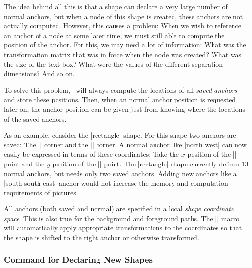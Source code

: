 The idea behind all this is that a shape can declare a very large
number of normal anchors, but when a node of this shape is created,
these anchors are not actually computed. However, this causes a
problem: When we wish to reference an anchor of a node at some later
time, we must still able to compute the position of the anchor. For 
this, we may need a lot of information: What was the transformation
matrix that was in force when the node was created? What was the size
of the text box? What were the values of the different separation
dimensions? And so on. 

To solve this problem, \pgfname\ will always compute the locations of
all \emph{saved anchors} and store these positions. Then, when an
normal anchor position is requested later on, the anchor position can
be given just from knowing where the locations of the saved anchors.

As an example, consider the |rectangle| shape. For this shape two
anchors are saved: The |\northeast| corner and the |\southwest|
corner. A normal anchor like |north west| can now easily be expressed
in terms of these coordinates: Take the $x$-position of the
|\southwest| point  and the $y$-position of the |\northeast| point. 
The |rectangle| shape currently defines 13 normal anchors, but needs
only two saved anchors. Adding new anchors like a  |south south east|
anchor would not increase the memory and computation requirements of
pictures. 

All anchors (both saved and normal) are specified in a local
\emph{shape coordinate space}. This is also true for the background
and foreground paths. The |\pgfnode| macro will automatically apply
appropriate transformations to the coordinates so that the shape is
shifted to the right anchor or otherwise transformed. 


\subsubsection{Command for Declaring New Shapes}

